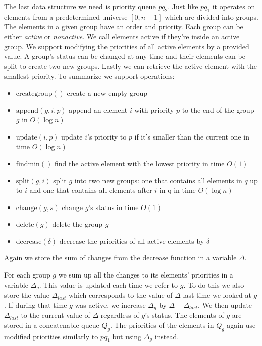The last data structure we need is priority queue $pq_2$. Just like $pq_1$ it operates on elements from a predetermined universe $[0, n-1]$ which are divided into groups. The elements in a given group have an order and priority. Each group can be either \textit{active} or \textit{nonactive}. We call elements active if they're inside an active group. We support modifying the priorities of all active elements by a provided value. A group's status can be changed at any time and their elements can be split to create two new groups. Lastly we can retrieve the active element with the smallest priority. To summarize we support operations:

\begin{itemize}
    \item $\text{creategroup}()$ create a new empty group
    \item $\text{append}(g, i, p)$ append an element $i$ with priority $p$ to the end of the group $g$ in $O(\log n)$
    \item $\text{update}(i, p)$ update $i$'s priority to $p$ if it's smaller than the current one in time $O(\log n)$
    \item $\text{findmin}()$ find the active element with the lowest priority in time $O(1)$
    \item $\text{split}(g, i)$ split $g$ into two new groups: one that contains all elements in $q$ up to $i$ and one that contains all elements after $i$ in q in time $O(\log n)$
    \item $\text{change}(g, s)$ change $g$'s status in time $O(1)$
    \item $\text{delete}(g)$ delete the group $g$
    \item $\text{decrease}(\delta)$ decrease the priorities of all active elements by $\delta$
\end{itemize}

Again we store the sum of changes from the decrease function in a variable $\Delta$.

For each group $g$ we sum up all the changes to its elements' priorities in a variable $\Delta_g$. This value is updated each time we refer to $g$. To do this we also store the value $\Delta_{last}$ which corresponds to the value of $\Delta$ last time we looked at $g$. If during that time $g$ was active, we increase $\Delta_g$ by $\Delta - \Delta_{last}$. We then update $\Delta_{last}$ to the current value of $\Delta$ regardless of $g$'s status. The elements of $g$ are stored in a concatenable queue $Q_g$. The priorities of the elements in $Q_g$ again use modified priorities similarly to $pq_1$ but using $\Delta_g$ instead. 

